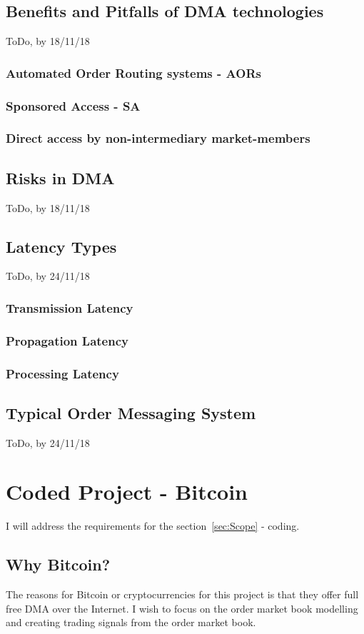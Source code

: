 \documentclass[12pt]{article}
\begin{document}
\subsection{Benefits and Pitfalls of DMA technologies}
ToDo, by 18/11/18
\subsubsection{Automated Order Routing systems - AORs}
\subsubsection{Sponsored Access - SA}
\subsubsection{Direct access by non-intermediary market-members}
\subsection{Risks in DMA}
ToDo, by 18/11/18
\subsection{Latency Types}
ToDo, by 24/11/18
\subsubsection{Transmission Latency}
\subsubsection{Propagation Latency}
\subsubsection{Processing Latency}
\subsection{Typical Order Messaging System}
\label{sec:Messaging}
ToDo, by 24/11/18
\section{Coded Project - Bitcoin}
I will address the requirements for the section~\ref{sec:Scope} - coding.
\subsection{Why Bitcoin?}
The reasons for Bitcoin or cryptocurrencies for this project is that they offer full free DMA over the Internet. I wish to focus on the order market book modelling and creating trading signals from the order market book.
\end{document}
